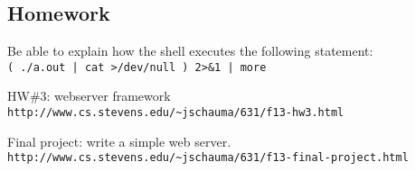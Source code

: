 \documentclass[xga]{xdvislides}
\begin{document}
\subsection{Homework}
Be able to explain how the shell executes the following statement: \\
{\tt ( ./a.out | cat >/dev/null ) 2>\&1 | more}

\vspace{.5in}
HW\#3: webserver framework \\
{\tt http://www.cs.stevens.edu/\~{}jschauma/631/f13-hw3.html}

\vspace{.5in}
Final project: write a simple web server. \\
{\tt http://www.cs.stevens.edu/\~{}jschauma/631/f13-final-project.html}
\end{document}
